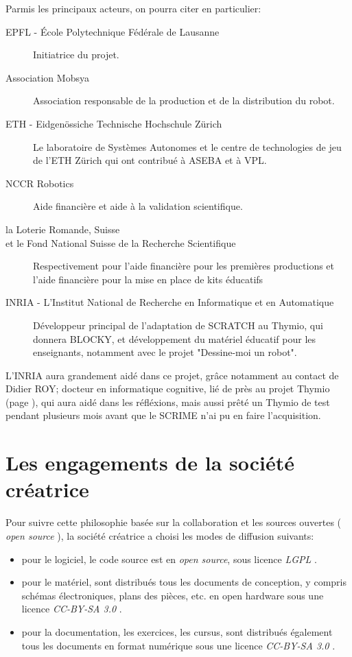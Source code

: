 \documentclass[a4paper, 12pt]{report}
\begin{document}
Parmis les principaux acteurs, on pourra citer en particulier:
\begin{description}
\item[EPFL - École Polytechnique Fédérale de Lausanne] Initiatrice du projet.
\item[Association Mobsya] Association responsable de la production et de la distribution du robot.
\item[ETH - Eidgenössiche Technische Hochschule Zürich] Le laboratoire de Systèmes Autonomes et le centre de technologies de jeu de l'ETH Zürich qui ont contribué à ASEBA et à VPL.
\item[NCCR Robotics] Aide financière et aide à la validation scientifique.
\item[la Loterie Romande, Suisse]
\item[et le Fond National Suisse de la Recherche Scientifique] Respectivement pour l'aide financière pour les premières productions et l'aide financière pour la mise en place de kits éducatifs
\item[INRIA - L'Institut National de Recherche en Informatique et en Automatique] Développeur principal de l'adaptation de SCRATCH au Thymio, qui donnera BLOCKY, et développement du matériel éducatif pour les enseignants, notamment avec le projet "Dessine-moi un robot". 
\end{description} 

L'INRIA aura grandement aidé dans ce projet, grâce notamment au contact de Didier ROY; docteur en informatique cognitive, lié de près au projet Thymio (page \pageref{thymio}), qui aura aidé dans les réfléxions, mais aussi prêté un Thymio de test pendant plusieurs mois avant que le SCRIME n'ai pu en faire l'acquisition.

\section{Les engagements de la société créatrice}
Pour suivre cette philosophie basée sur la collaboration et les sources ouvertes ( \textit{open source} ), la société créatrice a choisi les modes de diffusion suivants:
\begin{itemize}
\item pour le logiciel, le code source est en \textit{open source}, sous licence \textit{LGPL} .
\item pour le matériel, sont distribués tous les documents de conception, y compris schémas électroniques, plans des pièces, etc. en open hardware sous une licence \textit{CC-BY-SA 3.0} .
\item pour la documentation, les exercices, les cursus, sont distribués également tous les documents en format numérique sous une licence \textit{CC-BY-SA 3.0} .
\end{itemize}
\end{document}
